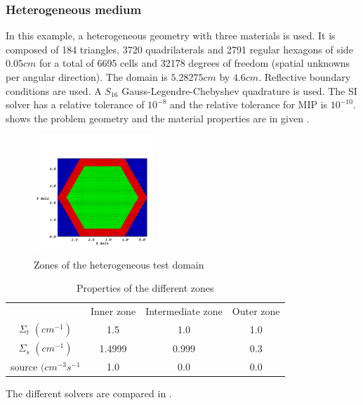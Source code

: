 \subsubsection{Heterogeneous medium}
In this example, a heterogeneous geometry with three materials is used. It is 
composed of 184 triangles, 3720 quadrilaterals and 2791 regular hexagons of 
side $0.05cm$ for a total of 6695 cells and 32178 degrees of freedom (spatial 
unknowns per angular direction). The domain is $5.28275cm$ by $4.6cm$. 
Reflective boundary conditions are used. A $S_{16}$ Gauss-Legendre-Chebyshev 
quadrature is used. The SI solver has a relative tolerance of 
$10^{-8}$ and the relative tolerance for MIP is $10^{-10}$. 
shows the problem geometry and the material properties are in given
.
\begin{figure}[H]
  \centering
  \includegraphics[width=0.4\textwidth]{source_crop}
  \caption{Zones of the heterogeneous test domain}
  \label{hex_zones}
\end{figure}
\begin{table}[H]
  \begin{center}
    \caption{Properties of the different zones}
    \begin{tabular}{|c|c|c|c|}
      \hline
       & Inner zone & Intermediate zone & Outer zone \\
      $\Sigma_t$ $(cm^{-1})$ & 1.5 & 1.0 & 1.0 \\
      $\Sigma_s$ $(cm^{-1})$ & 1.4999 & 0.999 & 0.3 \\
     source $(cm^{-3}s^{-1}$ & 1.0 & 0.0 & 0.0 \\
      \hline
    \end{tabular}
    \label{hex_prop}
  \end{center}
\end{table}
The different solvers are compared in .
